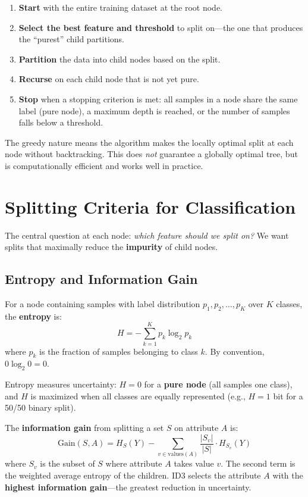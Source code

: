 \begin{enumerate}
    \item \textbf{Start} with the entire training dataset at the root node.
    \item \textbf{Select the best feature and threshold} to split on---the one that produces the ``purest'' child partitions.
    \item \textbf{Partition} the data into child nodes based on the split.
    \item \textbf{Recurse} on each child node that is not yet pure.
    \item \textbf{Stop} when a stopping criterion is met: all samples in a node share the same label (pure node), a maximum depth is reached, or the number of samples falls below a threshold.
\end{enumerate}

The greedy nature means the algorithm makes the locally optimal split at each node without backtracking. This does \textit{not} guarantee a globally optimal tree, but is computationally efficient and works well in practice.

\section*{Splitting Criteria for Classification}

The central question at each node: \textit{which feature should we split on?} We want splits that maximally reduce the \textbf{impurity} of child nodes.

\subsection*{Entropy and Information Gain}

\begin{definition}[Entropy]
For a node containing samples with label distribution $p_1, p_2, \ldots, p_K$ over $K$ classes, the \textbf{entropy} is:
$$H = -\sum_{k=1}^{K} p_k \log_2 p_k$$
where $p_k$ is the fraction of samples belonging to class $k$. By convention, $0 \log_2 0 = 0$.
\end{definition}

Entropy measures uncertainty: $H = 0$ for a \textbf{pure node} (all samples one class), and $H$ is maximized when all classes are equally represented (e.g., $H = 1$ bit for a 50/50 binary split).

\begin{definition}
The \textbf{information gain} from splitting a set $S$ on attribute $A$ is:
$$\text{Gain}(S, A) = H_S(Y) - \sum_{v \in \text{values}(A)} \frac{|S_v|}{|S|} \cdot H_{S_v}(Y)$$
where $S_v$ is the subset of $S$ where attribute $A$ takes value $v$. The second term is the weighted average entropy of the children. ID3 selects the attribute $A$ with the \textbf{highest information gain}---the greatest reduction in uncertainty.
\end{definition}

